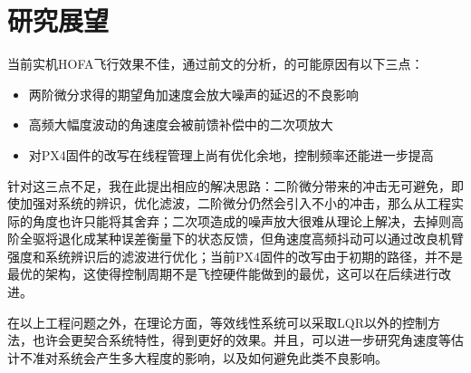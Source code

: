 \section{研究展望}
当前实机HOFA飞行效果不佳，通过前文的分析，的可能原因有以下三点：
\begin{itemize}
  \item 两阶微分求得的期望角加速度会放大噪声的延迟的不良影响
  \item 高频大幅度波动的角速度会被前馈补偿中的二次项放大
  \item 对PX4固件的改写在线程管理上尚有优化余地，控制频率还能进一步提高
\end{itemize}
针对这三点不足，我在此提出相应的解决思路：二阶微分带来的冲击无可避免，即使加强对系统的辨识，优化滤波，二阶微分仍然会引入不小的冲击，那么从工程实际的角度也许只能将其舍弃；二次项造成的噪声放大很难从理论上解决，去掉则高阶全驱将退化成某种误差衡量下的状态反馈，但角速度高频抖动可以通过改良机臂强度和系统辨识后的滤波进行优化；当前PX4固件的改写由于初期的路径，并不是最优的架构，这使得控制周期不是飞控硬件能做到的最优，这可以在后续进行改进。

在以上工程问题之外，在理论方面，等效线性系统可以采取LQR以外的控制方法，也许会更契合系统特性，得到更好的效果。并且，可以进一步研究角速度等估计不准对系统会产生多大程度的影响，以及如何避免此类不良影响。